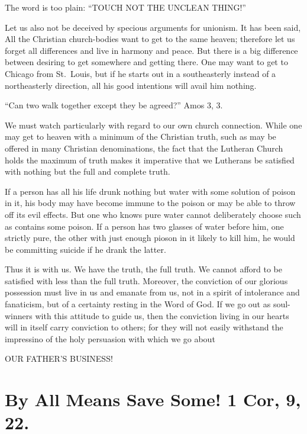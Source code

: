 \documentclass[
]{book}
\begin{document}
The word is too plain: ``TOUCH NOT THE UNCLEAN THING!''

Let us also not be deceived by specious arguments for unionism. It has been said, All the Christian church-bodies want to get to the same heaven; therefore let us forget all differences and live in harmony and peace. But there is a big difference between desiring to get somewhere and getting there. One may want to get to Chicago from St.~Louis, but if he starts out in a southeasterly instead of a northeasterly direction, all his good intentions will avail him nothing.

``Can two walk together except they be agreed?'' Amos 3, 3.

We must watch particularly with regard to our own church connection. While one may get to heaven with a minimum of the Christian truth, such as may be offered in many Christian denominations, the fact that the Lutheran Church holds the maximum of truth makes it imperative that we Lutherans be satisfied with nothing but the full and complete truth.

If a person has all his life drunk nothing but water with some solution of poison in it, his body may have become immune to the poison or may be able to throw off its evil effects. But one who knows pure water cannot deliberately choose such as contains some poison. If a person has two glasses of water before him, one strictly pure, the other with just enough pioson in it likely to kill him, he would be committing suicide if he drank the latter.

Thus it is with us. We have the truth, the full truth. We cannot afford to be satisfied with less than the full truth. Moreover, the conviction of our glorious possession must live in us and emanate from us, not in a spirit of intolerance and fanaticism, but of a certainty resting in the Word of God. If we go out as soul-winners with this attitude to guide us, then the conviction living in our hearts will in itself carry conviction to others; for they will not easily withstand the impressino of the holy persuasion with which we go about

\begin{center} OUR FATHER'S BUSINESS! \end{center}

\hypertarget{by-all-means-save-some-1-cor-9-22.}{%
\chapter{By All Means Save Some! 1 Cor, 9, 22.}\label{by-all-means-save-some-1-cor-9-22.}}
\end{document}

